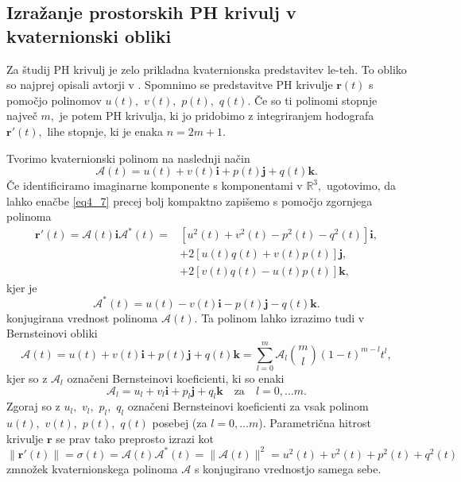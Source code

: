 \documentclass[12pt,a4paper,twoside]{article}
\theoremstyle{definition} %
\theoremstyle{plain} %
\numberwithin{equation}{section}  %
\newcommand{\R}{\mathbb R}
\newcommand{\rV}{\mathbf{r}}
\newcommand{\iV}{\mathbf{i}}
\newcommand{\jV}{\mathbf{j}}
\newcommand{\kV}{\mathbf{k}}
\newcommand{\AQ}{\mathcal{A}}
\begin{document}
\subsection{Izražanje prostorskih PH krivulj v kvaternionski obliki}
\label{PH_kvaternioni}

Za študij PH krivulj je zelo prikladna kvaternionska predstavitev le-teh. To obliko so najprej opisali avtorji v \cite{choi2002clifford}. Spomnimo se predstavitve PH krivulje $\rV(t)$ s pomočjo polinomov $u(t),$ $v(t),$ $p(t),$ $q(t)$. Če so ti polinomi stopnje največ $m,$ je potem PH krivulja, ki jo pridobimo z integriranjem hodografa $\rV'(t),$ lihe stopnje, ki je enaka $n=2m+1.$

Tvorimo kvaternionski polinom na naslednji način
\begin{equation}
	\AQ(t)=u(t)+v(t)\iV+p(t)\jV+q(t)\kV.
\end{equation}
Če identificiramo imaginarne komponente s komponentami v $\R^3,$ ugotovimo, da lahko enačbe \eqref{eq4_7} precej bolj kompaktno zapišemo s pomočjo zgornjega polinoma
\begin{align}
	\rV'(t)=\AQ(t)\iV\AQ^*(t)=&[u^2(t)+v^2(t)-p^2(t)-q^2(t)]\iV, \nonumber \\
	&+2[u(t)q(t)+v(t)p(t)]\jV, \nonumber \\
	&+2[v(t)q(t)-u(t)p(t)]\kV, \label{kvaternion}
\end{align}
kjer je
\begin{equation}
	\AQ^*(t)=u(t)-v(t)\iV-p(t)\jV-q(t)\kV.
\end{equation}
konjugirana vrednost polinoma $\AQ(t).$ Ta polinom lahko izrazimo tudi v Bernsteinovi obliki
\begin{equation}
	\AQ(t)=u(t)+v(t)\iV+p(t)\jV+q(t)\kV=\sum_{l=0}^m\AQ_l \binom{m}{l}(1-t)^{m-l}t^l,
\end{equation}
kjer so z $\AQ_l$ označeni Bernsteinovi koeficienti, ki so enaki
\begin{equation}
	\label{bern_koef_quat}
	\AQ_l=u_l+v_l\iV+p_l\jV+q_l\kV \quad \text{za} \quad l=0,\dots m.
\end{equation}
Zgoraj so z $u_l,$ $v_l,$ $p_l,$ $q_l$ označeni Bernsteinovi koeficienti za vsak polinom $u(t),$ $v(t),$ $p(t),$ $q(t)$ posebej (za $l=0,\dots m$). Parametrična hitrost krivulje $\rV$ se prav tako preprosto izrazi kot
\begin{equation}
	\label{kvaternionska_hitrost}
	\lVert \rV'(t) \rVert=\sigma(t)=\AQ(t) \AQ^*(t)=\lVert \AQ(t) \rVert^2=u^2(t)+v^2(t)+p^2(t)+q^2(t)
\end{equation}
zmnožek kvaternionskega polinoma $\AQ$ s konjugirano vrednostjo samega sebe.
\end{document}
